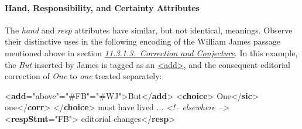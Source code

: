 \paragraph[{Hand, Responsibility, and Certainty Attributes}]{Hand, Responsibility, and Certainty Attributes}\label{PHHR}\par
The {\itshape hand} and {\itshape resp} attributes have similar, but not identical, meanings. Observe their distinctive uses in the following encoding of the William James passage mentioned above in section \textit{\hyperref[PHCC]{11.3.1.3.\ Correction and Conjecture}}. In this example, the \textit{But} inserted by James is tagged as an \hyperref[TEI.add]{<add>}, and the consequent editorial correction of \textit{One} to \textit{one} treated separately: \par\bgroup{}\exampleFont \begin{shaded}\noindent\mbox{}{<\textbf{add}\hspace*{1em}{place}="{above}"\hspace*{1em}{resp}="{\#FB}"\hspace*{1em}{hand}="{\#WJ}">}But{</\textbf{add}>}\mbox{}\newline 
{<\textbf{choice}>}\mbox{}\newline 
{}One{</\textbf{sic}>}\mbox{}\newline 
{}one{</\textbf{corr}>}\mbox{}\newline 
{</\textbf{choice}>} must have lived ... \mbox{}\newline 
\textit{<!-- elsewhere -->}\mbox{}\newline 
{<\textbf{respStmt}\hspace*{1em}{xml:id}="{FB}">}\mbox{}\newline 
{}editorial changes{</\textbf{resp}>}\mbox{}\newline 

\end{shaded}
